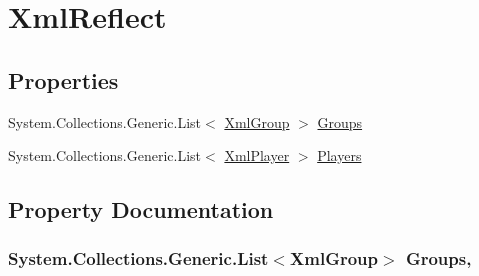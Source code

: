 \hypertarget{classOTA_1_1Permissions_1_1XmlReflect}{}\section{Xml\+Reflect}
\label{classOTA_1_1Permissions_1_1XmlReflect}
\subsection*{Properties}
\begin{DoxyCompactItemize}
\item 
System.\+Collections.\+Generic.\+List$<$ \hyperlink{classOTA_1_1Permissions_1_1XmlGroup}{Xml\+Group} $>$ \hyperlink{classOTA_1_1Permissions_1_1XmlReflect_a919681c30baac18b81839cf8b4a589b6}{Groups}
\item 
System.\+Collections.\+Generic.\+List$<$ \hyperlink{classOTA_1_1Permissions_1_1XmlPlayer}{Xml\+Player} $>$ \hyperlink{classOTA_1_1Permissions_1_1XmlReflect_abd51d2a63e265b90600180820cd80bda}{Players}
\end{DoxyCompactItemize}


\subsection{Property Documentation}
\hypertarget{classOTA_1_1Permissions_1_1XmlReflect_a919681c30baac18b81839cf8b4a589b6}{}
\subsubsection[{Groups}]{\setlength{\rightskip}{0pt plus 5cm}System.\+Collections.\+Generic.\+List$<${\bf Xml\+Group}$>$ Groups\hspace{0.3cm}{\ttfamily [get]}, {\ttfamily [set]}}\label{classOTA_1_1Permissions_1_1XmlReflect_a919681c30baac18b81839cf8b4a589b6}
\hypertarget{classOTA_1_1Permissions_1_1XmlReflect_abd51d2a63e265b90600180820cd80bda}{}
